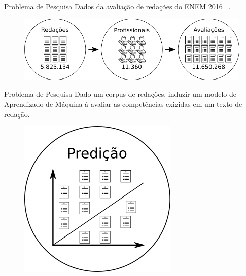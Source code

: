 \documentclass[10pt]{beamer}
\begin{document}
    \begin{frame}[fragile]{Problema de Pesquisa}
    Dados da avaliação de redações do ENEM 2016 ~\cite{paq_a:2016}.
    \begin{figure}[H]
    \begin{center}
        \includegraphics[scale=0.50]{images/enem_2016.png}
    \end{center}
    \end{figure}
    \end{frame}

    \begin{frame}[fragile]{Problema de Pesquisa}
    Dado um corpus de redações, induzir um modelo de Aprendizado de Máquina à avaliar as competências exigidas em um texto de redação.
    \begin{figure}[H]
    \begin{center}
        \includegraphics[scale=0.50]{images/prediction.png}
    \end{center}
    \end{figure}
    \end{frame}
\end{document}
